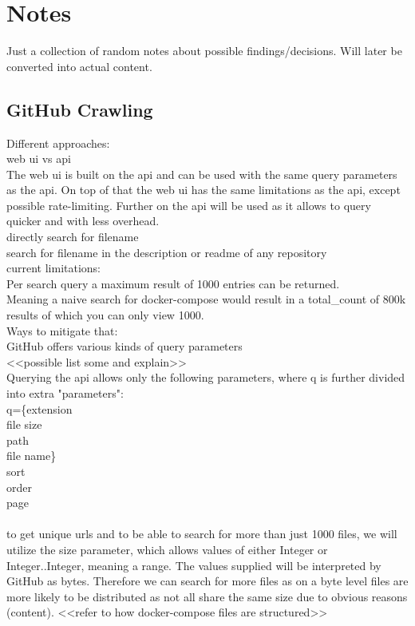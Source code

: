 \chapter{Notes}

Just a collection of random notes about possible findings/decisions. Will later be converted into actual content.

\section{GitHub Crawling}

Different approaches:\\
web ui vs api\\
The web ui is built on the api and can be used with the same query parameters as the api. On top of that the web ui has the same limitations as the api, except possible rate-limiting. Further on the api will be used as it allows to query quicker and with less overhead.\\

directly search for filename\\
search for filename in the description or readme of any repository\\

current limitations:\\
Per search query a maximum result of 1000 entries can be returned.\\
Meaning a naive search for docker-compose would result in a total\_count of 800k results of which you can only view 1000.\\

Ways to mitigate that:\\
GitHub offers various kinds of query parameters\\
<<possible list some and explain>>\\
Querying the api allows only the following parameters, where q is further divided into extra "parameters":\\
q=\{extension\\
file size\\
path\\
file name\}\\
sort\\
order\\
page\\
\\
to get unique urls and to be able to search for more than just 1000 files, we will utilize the size parameter, which allows values of either Integer or Integer..Integer, meaning a range. The values supplied will be interpreted by GitHub as bytes. Therefore we can search for more files as on a byte level files are more likely to be distributed as not all share the same size due to obvious reasons (content). <<refer to how docker-compose files are structured>>


